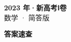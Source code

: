 \documentclass[zihao=-4, a4paper]{ctexart}
\begin{document}
\begin{center}
  {\Large\bfseries 2023 年·新高考Ⅰ卷}\\[4pt]
  {\large 数学 · 简答版}
\end{center}
\medskip
{}

\clearpage
{}
\begin{center}{\Large\bfseries 答案速查}\end{center}
\medskip

\end{document}
